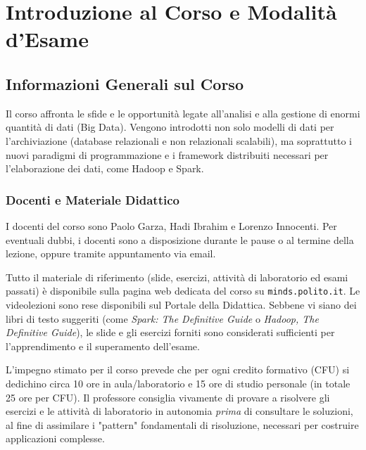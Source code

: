 \chapter*{Introduzione al Corso e Modalità
d’Esame}

\section*{Informazioni Generali sul Corso}
Il corso affronta le sfide e le opportunità legate all'analisi e alla gestione di enormi quantità di dati (Big Data). Vengono introdotti non solo modelli di dati per l'archiviazione (database relazionali e non relazionali scalabili), ma soprattutto i nuovi paradigmi di programmazione e i framework distribuiti necessari per l'elaborazione dei dati, come Hadoop e Spark.

\subsection*{Docenti e Materiale Didattico}
I docenti del corso sono Paolo Garza, Hadi Ibrahim e Lorenzo Innocenti. Per eventuali dubbi, i docenti sono a disposizione durante le pause o al termine della lezione, oppure tramite appuntamento via email.

Tutto il materiale di riferimento (slide, esercizi, attività di laboratorio ed esami passati) è disponibile sulla pagina web dedicata del corso su \texttt{minds.polito.it}. Le videolezioni sono rese disponibili sul Portale della Didattica. Sebbene vi siano dei libri di testo suggeriti (come \textit{Spark: The Definitive Guide} o \textit{Hadoop, The Definitive Guide}), le slide e gli esercizi forniti sono considerati sufficienti per l'apprendimento e il superamento dell'esame.

\begin{remark}
L'impegno stimato per il corso prevede che per ogni credito formativo (CFU) si dedichino circa 10 ore in aula/laboratorio e 15 ore di studio personale (in totale 25 ore per CFU). 
Il professore consiglia vivamente di provare a risolvere gli esercizi e le attività di laboratorio in autonomia \textit{prima} di consultare le soluzioni, al fine di assimilare i "pattern" fondamentali di risoluzione, necessari per costruire applicazioni complesse.
\end{remark}

